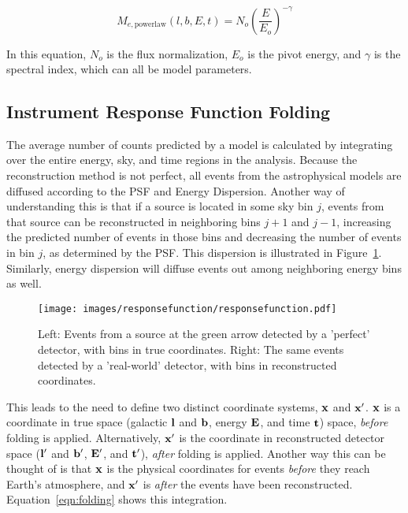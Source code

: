   \begin{equation}\label{eqn:powerlaw_Me}
    M_{e,\textrm{powerlaw}}(l,b,E,t) = N_o \left ( \frac{E}{E_o} \right )^{-\gamma}
  \end{equation}

  In this equation, $N_o$ is the flux normalization, $E_o$ is the pivot energy, and $\gamma$ is the spectral index, which can all be model parameters.

  
  \subsection{Instrument Response Function Folding}\label{subsec:folding}
  The average number of counts predicted by a model is calculated by integrating over the entire energy, sky, and time regions in the analysis.
  Because the reconstruction method is not perfect, all events from the astrophysical models are diffused according to the PSF and Energy Dispersion.
  Another way of understanding this is that if a source is located in some sky bin $j$, events from that source can be reconstructed in neighboring bins $j+1$ and $j-1$, increasing the predicted number of events in those bins and decreasing the number of events in bin $j$, as determined by the PSF.
  This dispersion is illustrated in Figure~\ref{fig:responsedispersion}.
  Similarly, energy dispersion will diffuse events out among neighboring energy bins as well.
  
  \begin{figure}[h]
    \centering
    \texttt{[image: images/responsefunction/responsefunction.pdf]}
    \caption[Response Function Dispersion]
    {
      Left: Events from a source at the green arrow detected by a 'perfect' detector, with bins in true coordinates.
      Right: The same events detected by a 'real-world' detector, with bins in reconstructed coordinates.
    }
    \label{fig:responsedispersion}
  \end{figure}
  
  This leads to the need to define two distinct coordinate systems, $\mathbf{x }$ and $\mathbf{x'}$.
  $\mathbf{x }$ is a coordinate in true space (galactic $\mathbf{l }$ and $\mathbf{b }$, energy $\mathbf{E }$, and time $\mathbf{t }$) space, \textit{before} folding is applied.
  Alternatively, $\mathbf{x'}$ is the coordinate in reconstructed detector space ($\mathbf{l'}$ and $\mathbf{b'}$, $\mathbf{E'}$, and $\mathbf{t'}$), \textit{after} folding is applied.
  Another way this can be thought of is that $\mathbf{x }$ is the physical coordinates for events \textit{before} they reach Earth's atmosphere, and $\mathbf{x'}$ is \textit{after} the events have been reconstructed.
  Equation~\ref{eqn:folding} shows this integration.
  
